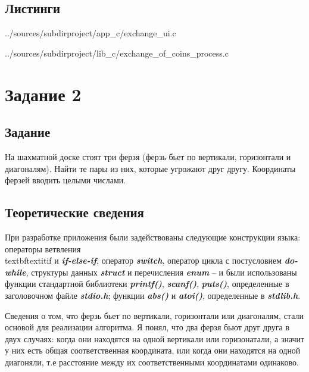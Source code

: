 \documentclass[12pt,a4paper]{report}
\begin{document}
\subsection*{Листинги}

{../sources/subdirproject/app_c/exchange_ui.c}


{../sources/subdirproject/lib_c/exchange_of_coins_process.c}


\section{Задание 2}

\subsection{Задание}
На шахматной доске стоят три ферзя (ферзь бьет по вертикали, горизонтали и диагоналям). Найти те пары из них, которые угрожают друг другу. Координаты ферзей вводить целыми числами.
\subsection{Теоретические сведения}
При разработке приложения были задействованы следующие конструкции языка: операторы ветвления \\textbf{textit{if}} и \textbf{\textit{if-else-if}}, оператор \textit{\textbf{switch}}, оператор цикла с постусловием \textbf{\textit{do-while}}, структуры данных \textbf{\textit{struct}} и перечисления \textit{\textbf{enum}} -- и были использованы функции стандартной библиотеки \textbf{\textit{printf()}}, \textit{\textbf{scanf()}}, \textit{\textbf{puts()}}, определенные в заголовочном файле \textit{\textbf{stdio.h}}; функции \textit{\textbf{abs()}} и \textit{\textbf{atoi()}}, определенные в \textit{\textbf{stdlib.h}}.

Сведения о том, что ферзь бьет по вертикали, горизонтали или диагоналям, стали основой для реализации алгоритма. Я понял, что два ферзя бьют друг друга в двух случаях: когда они находятся на одной вертикали или горизонатали, а значит у них есть общая соответственная координата, или когда они находятся на одной диагоняли, т.е расстояние между их соответственными координатами одинаково.
\end{document}
